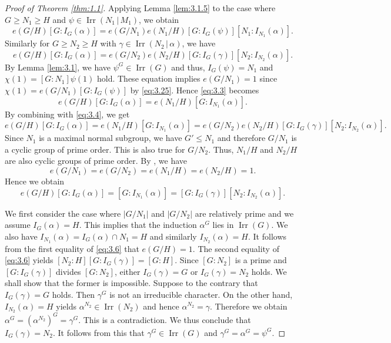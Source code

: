 \documentclass[a4paper,12pt]{article}
\theoremstyle{definition}
\theoremstyle{remark}
\DeclareMathOperator{\irr}{Irr}
\numberwithin{equation}{section}
\begin{document}
\begin{proof}[Proof of Theorem \ref{thm:1.1}]
Applying Lemma \ref{lem:3.1.5} to the case where $G \ge N_1 \ge H$ 
and $\psi \in \irr (N_1 \,|\, M_1)$, 
we obtain
\begin{equation} \label{eq:3.3}
e (G/H) [G: I_G (\alpha )] = e (G/N_1) e(N_1/H) [G: I_G (\psi)] [N_1 : I_{N_1} (\alpha )].
\end{equation}
Similarly for $G \ge N_2 \ge H$ with $\gamma \in \irr (N_2 \,|\, \alpha )$, we have
\begin{equation} \label{eq:3.4}
e (G/H) [G: I_G (\alpha )] = e (G/N_2) e(N_2/H) [G: I_G (\gamma)] [N_2 : I_{N_2} (\alpha )].
\end{equation}
By Lemma \ref{lem:3.1}, we have $\psi^G \in \irr (G)$ and thus, $I_G (\psi ) =N_1$ and 
$\chi (1) = [G:N_1] \psi (1)$ hold.
These equation implies $e (G/N_1)=1$ since $\chi (1)= e(G/N_1) [G:I_G (\psi)]$ by \eqref{eq:3.25}.
Hence \eqref{eq:3.3} becomes
\begin{equation} \label{eq:3.5}
e (G/H) [G: I_G (\alpha )] =  e(N_1/H) [G: I_{N_1} (\alpha )].
\end{equation}
By combining with \eqref{eq:3.4}, we get 
\[
e (G/H) [G: I_G (\alpha )] =  e(N_1/H) [G: I_{N_1} (\alpha )]=e (G/N_2) e(N_2/H) [G: I_G (\gamma)] [N_2 : I_{N_2} (\alpha )].
\]
Since $N_1$ is a maximal normal subgroup, we have $G' \le N_1$ and therefore $G/N_1$ is a cyclic group 
of prime order. This is also true for $G/N_2$. Thus, $N_1/H $ and $N_2/H$ are also cyclic groups of
prime order.
By \cite[Corollary 6.19]{MR0460423}, we have 
\begin{equation} \label{eq:3.5.5}
    e(G/N_1)=e(G/N_2)= e(N_1/H)=e(N_2/H)=1.
\end{equation}
Hence we obtain 
\begin{equation} \label{eq:3.6}
e (G/H) [G: I_G (\alpha )] =  [G: I_{N_1} (\alpha )]= [G: I_G (\gamma)] [N_2 : I_{N_2} (\alpha )].    
\end{equation}

We first consider the case where $|G/N_1|$ and $|G/N_2|$ are relatively prime and we assume 
$I_G (\alpha ) = H$. This implies that the induction $\alpha^G$ lies in $\irr (G)$.
We also have $I_{N_1} (\alpha ) =I_G (\alpha ) \cap N_1 = H$ and similarly $I_{N_2} (\alpha ) =H$.
It follows from the first equality of \eqref{eq:3.6} that $e(G/H)=1$.
The second equality of \eqref{eq:3.6} yields $ [N_2: H] [G: I_G (\gamma )] = [G: H]$.
Since $[G :N_2]$ is a prime and $[G:I_G (\gamma) ] $ divides $[G: N_2]$, either $I_G (\gamma ) =G$
or $I_G (\gamma ) =N_2$ holds. We shall show that the former is impossible.
Suppose to the contrary that $I_G (\gamma ) =G$ holds. Then $\gamma^G$ is not an irreducible character. 
On the other hand, $I_{N_2} (\alpha ) =H$ yields $\alpha^{N_2} \in \irr (N_2)$ and hence 
$\alpha^{N_2} = \gamma $. Therefore we obtain $\alpha^G =(\alpha^{N_2})^G =\gamma^G$. 
This is a contradiction. We thus conclude that $I_G (\gamma ) = N_2$. It follows from this that
$\gamma^G \in \irr (G)$ and $\gamma^G = \alpha^G = \psi^G$.


\end{proof}
\end{document}
